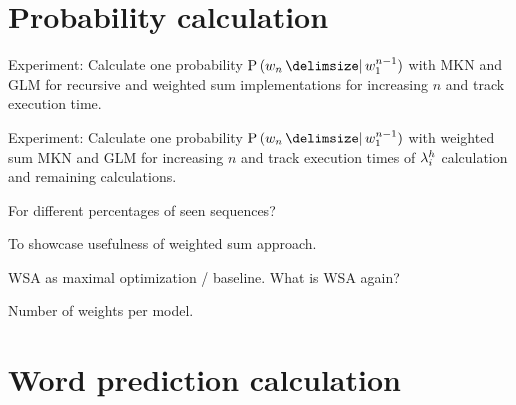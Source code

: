 \section{Probability calculation}
\label{sec:evaluation-probability}

\begin{draft}
Experiment: Calculate one probability $\Prob{w_n}{w_1^{n-1}}$ with MKN and GLM
for recursive and weighted sum implementations for increasing $n$ and track
execution time.

Experiment: Calculate one probability $\Prob{w_n}{w_1^{n-1}}$ with weighted sum
MKN and GLM for increasing $n$ and track execution times of $\lambda^h_i$
calculation and remaining calculations.

For different percentages of seen sequences?

To showcase usefulness of weighted sum approach.

WSA as maximal optimization / baseline.
What is WSA again?

Number of weights per model.
\end{draft}

%    
%    

\section{Word prediction calculation}

